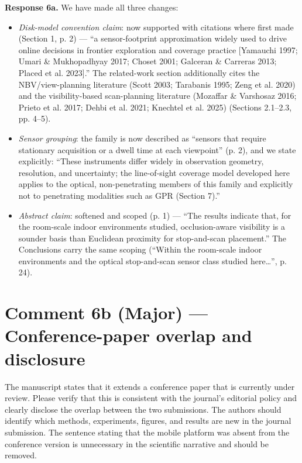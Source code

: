\textbf{Response 6a.} We have made all three changes:
\begin{itemize}
\item \emph{Disk-model convention claim}: now supported with citations where first made (Section 1, p. 2) — “a sensor-footprint approximation widely used to drive online decisions in frontier exploration and coverage practice [Yamauchi 1997; Umari \& Mukhopadhyay 2017; Choset 2001; Galceran \& Carreras 2013; Placed et al. 2023].” The related-work section additionally cites the NBV/view-planning literature (Scott 2003; Tarabanis 1995; Zeng et al. 2020) and the visibility-based scan-planning literature (Mozaffar \& Varshosaz 2016; Prieto et al. 2017; Dehbi et al. 2021; Knechtel et al. 2025) (Sections 2.1–2.3, pp. 4–5).
\item \emph{Sensor grouping}: the family is now described as “sensors that require stationary acquisition or a dwell time at each viewpoint” (p. 2), and we state explicitly: “These instruments differ widely in observation geometry, resolution, and uncertainty; the line-of-sight coverage model developed here applies to the optical, non-penetrating members of this family and explicitly not to penetrating modalities such as GPR (Section 7).”
\item \emph{Abstract claim}: softened and scoped (p. 1) — “The results indicate that, for the room-scale indoor environments studied, occlusion-aware visibility is a sounder basis than Euclidean proximity for stop-and-scan placement.” The Conclusions carry the same scoping (“Within the room-scale indoor environments and the optical stop-and-scan sensor class studied here…”, p. 24).
\end{itemize}

\section*{Comment 6b (Major) — Conference-paper overlap and disclosure}

\begin{quoting}
The manuscript states that it extends a conference paper that is currently under review. Please verify that this is consistent with the journal’s editorial policy and clearly disclose the overlap between the two submissions. The authors should identify which methods, experiments, figures, and results are new in the journal submission. The sentence stating that the mobile platform was absent from the conference version is unnecessary in the scientific narrative and should be removed.
\end{quoting}

